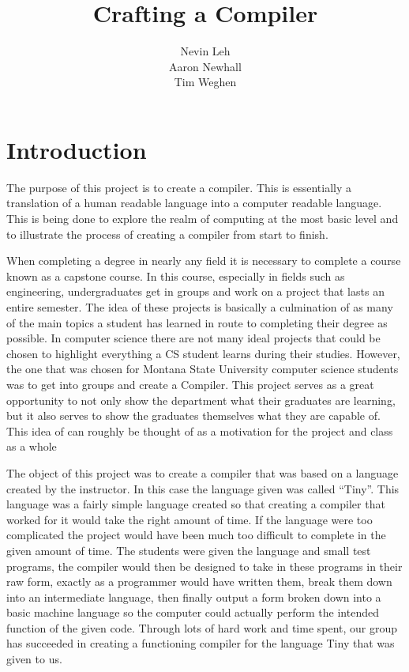 \documentclass[12pt, oneside]{article}   	%
\title{Crafting a Compiler}
\author{Nevin Leh\\Aaron Newhall\\Tim Weghen}
\begin{document}
\begin{titlepage}
	\maketitle
\end{titlepage}
\setcounter{page}{2}
\tableofcontents
\section{Introduction}
The purpose of this project is to create a compiler. This is essentially a translation of a human readable language into a computer 
readable language. This is being done to explore the realm of computing at the most basic level and to illustrate the process of 
creating a compiler from start to finish.

When completing a degree in nearly any field it is necessary to complete a
course known as a capstone course. In this course, especially in fields such as
engineering, undergraduates get in groups and work on a project that lasts an
entire semester. The idea of these projects is basically a culmination of as many
of the main topics a student has learned in route to completing their degree as
possible. In computer science there are not many ideal projects that could be
chosen to highlight everything a CS student learns during their studies. However,
the one that was chosen for Montana State University computer science students
was to get into groups and create a Compiler. This project serves as a great
opportunity to not only show the department what their graduates are learning,
but it also serves to show the graduates themselves what they are capable of.
This idea of can roughly be thought of as a motivation for the project and class as
a whole

The object of this project was to create a compiler that was based on a
language created by the instructor. In this case the language given was called
“Tiny”. This language was a fairly simple language created so that creating a
compiler that worked for it would take the right amount of time. If the language
were too complicated the project would have been much too difficult to complete
in the given amount of time. The students were given the language and small test
programs, the compiler would then be designed to take in these programs in their
raw form, exactly as a programmer would have written them, break them down
into an intermediate language, then finally output a form broken down into a basic
machine language so the computer could actually perform the intended function
of the given code. Through lots of hard work and time spent, our group has
succeeded in creating a functioning compiler for the language Tiny that was
given to us.
\end{document}
